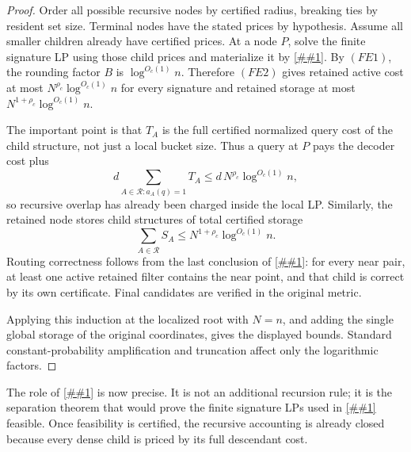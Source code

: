 \documentclass[10pt]{article}
\newcommand{\cref}[1]{\ref{##1}}
\theoremstyle{definition}
\begin{document}
\begin{proof}
   Order all possible recursive nodes by certified radius, breaking ties by
   resident set size.  Terminal nodes have the stated prices by hypothesis.
   Assume all smaller children already have certified prices.  At a node \(P\),
   solve the finite signature LP using those child prices and materialize it by
   \cref{lem:finite-signature-filter-cover}.  By \((FE1)\), the rounding factor
   \(B\) is \(\log^{O_c(1)}n\).  Therefore \((FE2)\) gives retained active cost
   at most \(N^{\rho_c}\log^{O_c(1)}n\) for every signature and retained storage
   at most \(N^{1+\rho_c}\log^{O_c(1)}n\).

   The important point is that \(T_A\) is the full certified normalized query
   cost of the child structure, not just a local bucket size.  Thus a query at
   \(P\) pays the decoder cost plus
   \[
      d\sum_{A\in\mathcal R:a_A(q)=1}T_A
      \le
      d\,N^{\rho_c}\log^{O_c(1)}n,
   \]
   so recursive overlap has already been charged inside the local LP.  Similarly,
   the retained node stores child structures of total certified storage
   \[
      \sum_{A\in\mathcal R}S_A
      \le
      N^{1+\rho_c}\log^{O_c(1)}n.
   \]
   Routing correctness follows from the last conclusion of
   \cref{lem:finite-signature-filter-cover}: for every near pair, at least one
   active retained filter contains the near point, and that child is correct by
   its own certificate.  Final candidates are verified in the original metric.

   Applying this induction at the localized root with \(N=n\), and adding the
   single global storage of the original coordinates, gives the displayed
   bounds.  Standard constant-probability amplification and truncation affect
   only the logarithmic factors.
\end{proof}

The role of \cref{asm:weighted-dense-spherical-dichotomy} is now precise.  It is
not an additional recursion rule; it is the separation theorem that would prove
the finite signature LPs used in \cref{prop:fractional-filter-cover-polylog}
feasible.  Once feasibility is certified, the recursive accounting is already
closed because every dense child is priced by its full descendant cost.
\end{document}
